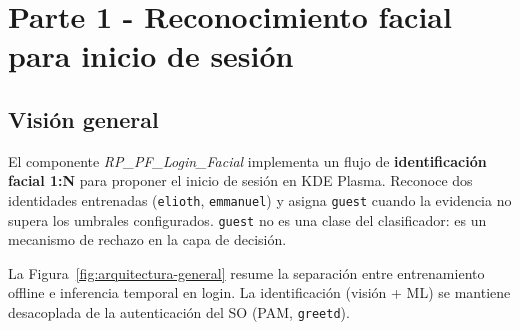 %
\providecommand{\assetroot}{../assets}


\section{Parte 1 - Reconocimiento facial para inicio de sesión}
\label{sec:parte1-facial}

\subsection{Visión general}
\label{subsec:vision-general}

El componente \textit{RP\_PF\_Login\_Facial} implementa un flujo de
\textbf{identificación facial 1:N} para proponer el inicio de sesión en KDE Plasma.
Reconoce dos identidades entrenadas (\texttt{elioth}, \texttt{emmanuel}) y asigna
\texttt{guest} cuando la evidencia no supera los umbrales configurados.
\texttt{guest} no es una clase del clasificador: es un mecanismo de rechazo en la
capa de decisión.

La Figura~\ref{fig:arquitectura-general} resume la separación entre entrenamiento
offline e inferencia temporal en login. La identificación (visión + ML) se mantiene
desacoplada de la autenticación del SO (PAM, \texttt{greetd}).

